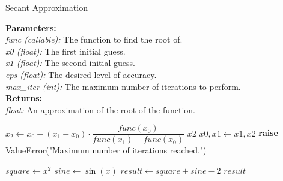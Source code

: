       \begin{algorithm}
      \caption{Secant Approximation}\label{Root Approximation}
        \begin{tabbing}
          \textbf{Parameters:}\\
            \hspace{1em}\textit{func (callable):} The function to find the root of.\\
            \hspace{1em}\textit{x0 (float):} The first initial guess.\\
            \hspace{1em}\textit{x1 (float):} The second initial guess.\\
            \hspace{1em}\textit{eps (float):} The desired level of accuracy.\\
            \hspace{1em}\textit{max\_iter (int):} The maximum number of iterations to perform.\\
            
          \textbf{Returns:}\\
            \hspace{1em}\textit{float:} An approximation of the root of the function.
        \end{tabbing}
        \vspace{1 em}
      \begin{algorithmic}[1]
            \State $x_2 \gets x_0 - (x_1 - x_0) \cdot \dfrac{func(x_0)}{func(x_1) - func(x_0)}$ 
              \State \Return $x2$
            \Else
              \State $x0, x1 \gets x1, x2$ 
            \EndIf
          \EndFor
          \State \textbf{raise} ValueError("Maximum number of iterations reached.")
        \EndFunction
        \end{algorithmic}
        \vspace{1 em}
        
        \begin{algorithmic}[1]
            \State $square \gets x^2$
            \State $sine \gets \sin(x)$
            \State $result \gets square + sine - 2$
            \State \Return $result$
          \EndFunction
        \end{algorithmic}      
      \end{algorithm}

